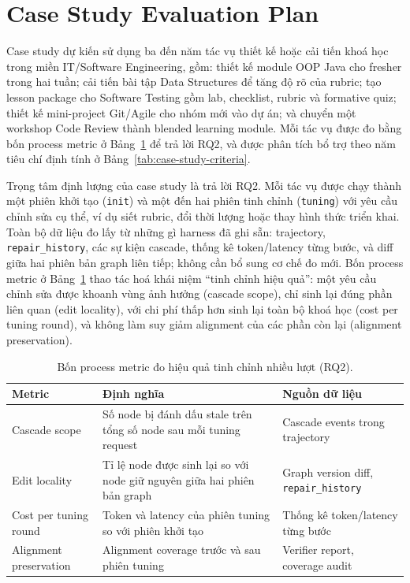 \documentclass[../main.tex]{subfiles}
\begin{document}
\section{Case Study Evaluation Plan}

Case study dự kiến sử dụng ba đến năm tác vụ thiết kế hoặc cải tiến khoá học trong miền IT/Software Engineering, gồm: thiết kế module OOP Java cho fresher trong hai tuần; cải tiến bài tập Data Structures để tăng độ rõ của rubric; tạo lesson package cho Software Testing gồm lab, checklist, rubric và formative quiz; thiết kế mini-project Git/Agile cho nhóm mới vào dự án; và chuyển một workshop Code Review thành blended learning module. Mỗi tác vụ được đo bằng bốn process metric ở Bảng~\ref{tab:tuning-metrics} để trả lời RQ2, và được phân tích bổ trợ theo năm tiêu chí định tính ở Bảng~\ref{tab:case-study-criteria}.

Trọng tâm định lượng của case study là trả lời RQ2. Mỗi tác vụ được chạy thành một phiên khởi tạo (\texttt{init}) và một đến hai phiên tinh chỉnh (\texttt{tuning}) với yêu cầu chỉnh sửa cụ thể, ví dụ siết rubric, đổi thời lượng hoặc thay hình thức triển khai. Toàn bộ dữ liệu đo lấy từ những gì harness đã ghi sẵn: trajectory, \texttt{repair\_history}, các sự kiện cascade, thống kê token/latency từng bước, và diff giữa hai phiên bản graph liên tiếp; không cần bổ sung cơ chế đo mới. Bốn process metric ở Bảng~\ref{tab:tuning-metrics} thao tác hoá khái niệm ``tinh chỉnh hiệu quả'': một yêu cầu chỉnh sửa được khoanh vùng ảnh hưởng (cascade scope), chỉ sinh lại đúng phần liên quan (edit locality), với chi phí thấp hơn sinh lại toàn bộ khoá học (cost per tuning round), và không làm suy giảm alignment của các phần còn lại (alignment preservation).

\begin{table}[H]
\centering
\small
\caption{Bốn process metric đo hiệu quả tinh chỉnh nhiều lượt (RQ2).}
\label{tab:tuning-metrics}
\begin{tabular}{p{3.2cm}p{5.6cm}p{3.9cm}}
\hline
\textbf{Metric} & \textbf{Định nghĩa} & \textbf{Nguồn dữ liệu} \\
\hline
Cascade scope & Số node bị đánh dấu stale trên tổng số node sau mỗi tuning request & Cascade events trong trajectory \\
Edit locality & Tỉ lệ node được sinh lại so với node giữ nguyên giữa hai phiên bản graph & Graph version diff, \texttt{repair\_history} \\
Cost per tuning round & Token và latency của phiên tuning so với phiên khởi tạo & Thống kê token/latency từng bước \\
Alignment preservation & Alignment coverage trước và sau phiên tuning & Verifier report, coverage audit \\
\hline
\end{tabular}
\end{table}
\end{document}
